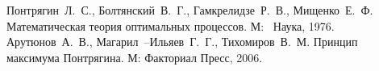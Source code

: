 \documentclass[11pt]{article}
\begin{document}
\pagebreak
{}
\begin{thebibliography}{99}
	 Понтрягин~Л.~С., Болтянский~В.~Г., Гамкрелидзе~Р.~В., Мищенко~Е.~Ф. Математическая теория оптимальных процессов. М:~ Наука, 1976.
	 Арутюнов~А.~В., Магарил~--Ильяев~Г.~Г., Тихомиров~В.~М. Принцип максимума Понтрягина. М: Факториал Пресс, 2006.
\end{thebibliography}
\end{document}

